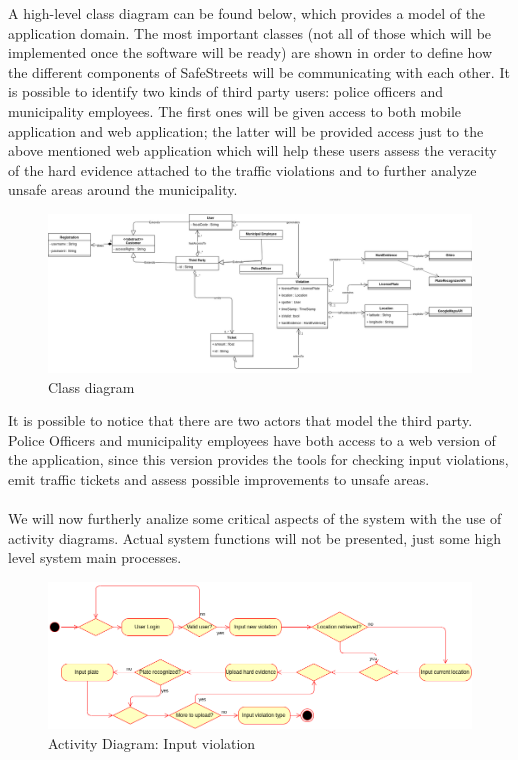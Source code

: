 \documentclass{article}
\begin{document}
A high-level class diagram can be found below, which provides a model of the
application domain. The most important classes (not all of those which will be
implemented once the software will be ready) are shown in order to define how
the different components of SafeStreets will be communicating with each other.
It is possible to identify two kinds of third party users: police officers and
municipality employees. The first ones will be given access to both mobile
application and web application; the latter will be provided access just to the
above mentioned web application which will help these users assess the veracity
of the hard evidence attached to the traffic violations and to further analyze
unsafe areas around the municipality.\\

\begin{figure}[H]
    \centering
    \includegraphics[scale=0.255]{Images/umlmodel}
    \caption{Class diagram}
\end{figure}

It is possible to notice that there are two actors that model the third party.
Police Officers and municipality employees have both access to a web version of
the application, since this version provides the tools for checking input
violations, emit traffic tickets and assess possible improvements to unsafe areas.\\
\\
We will now furtherly analize some critical aspects of the system with the use
of activity diagrams. Actual system functions will not be presented, just some
high level system main processes.

\begin{figure}[H]
    \centering
    \includegraphics[scale=0.36]{Images/ActivityInputViolation}
    \caption{Activity Diagram: Input violation}
\end{figure}
\end{document}
